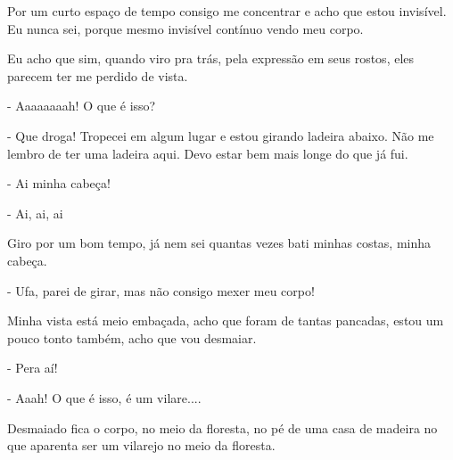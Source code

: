 Por um curto espaço de tempo consigo me concentrar e acho que estou invisível. Eu nunca sei, porque mesmo invisível contínuo vendo meu corpo.

Eu acho que sim, quando viro pra trás, pela expressão em seus rostos, eles parecem ter me perdido de vista.

- Aaaaaaaah! O que é isso?

- Que droga! Tropecei em algum lugar e estou girando ladeira abaixo. Não me lembro de ter uma ladeira aqui. Devo estar bem mais longe do que já fui.

- Ai minha cabeça!

- Ai, ai, ai

Giro por um bom tempo, já nem sei quantas vezes bati minhas costas, minha cabeça.

- Ufa, parei de girar, mas não consigo mexer meu corpo!

Minha vista está meio embaçada, acho que foram de tantas pancadas, estou um pouco tonto também, acho que vou desmaiar. 

- Pera aí!

- Aaah! O que é isso, é um vilare....

Desmaiado fica o corpo, no meio da floresta, no pé de uma casa de madeira no que aparenta ser um vilarejo no meio da floresta.



